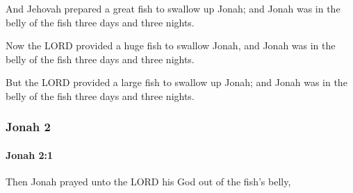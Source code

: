			\begin{versebox}
					\item[BHS] 
					\item[LXX] 
					\item[ASV] And Jehovah prepared a great fish to swallow up Jonah; and Jonah was in the belly of the fish three days and three nights.
					\item[NIV] Now the LORD provided a huge fish to swallow Jonah, and Jonah was in the belly of the fish three days and three nights.
					\item[NRSV] But the LORD provided a large fish to swallow up Jonah; and Jonah was in the belly of the fish three days and three nights.
			\end{versebox}
	\subsubsection{Jonah 2} %
		\label{JONAH-2}

		\paragraph{Jonah 2:1} %
			\label{JONAH-2-1}

			Then Jonah prayed unto the LORD his God out of the fish’s belly,

